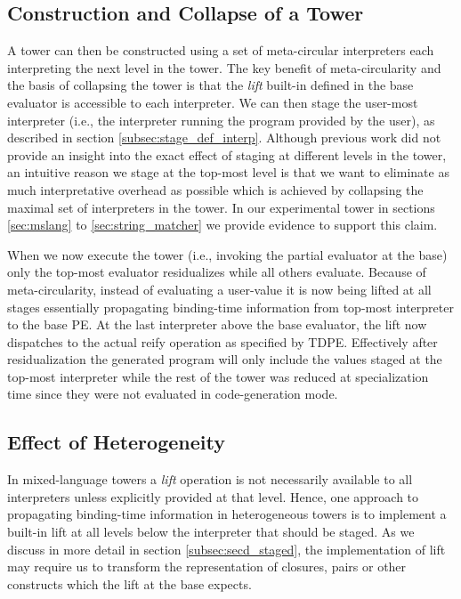 \documentclass[a4paper,12pt,twoside,openright]{report}
\theoremstyle{definition}
\begin{document}
\subsection{Construction and Collapse of a Tower}
A tower can then be constructed using a set of meta-circular interpreters each interpreting the next level in the tower. The key benefit of meta-circularity and the basis of collapsing the tower is that the \textit{lift} built-in defined in the base evaluator is accessible to each interpreter. We can then stage the user-most interpreter (i.e., the interpreter running the program provided by the user), as described in section \ref{subsec:stage_def_interp}. Although previous work did not provide an insight into the exact effect of staging at different levels in the tower, an intuitive reason we stage at the top-most level is that we want to eliminate as much interpretative overhead as possible which is achieved by collapsing the maximal set of interpreters in the tower. In our experimental tower in sections \ref{sec:mslang} to \ref{sec:string_matcher} we provide evidence to support this claim.

When we now execute the tower (i.e., invoking the partial evaluator at the base) only the top-most evaluator residualizes while all others evaluate. Because of meta-circularity, instead of evaluating a user-value it is now being lifted at all stages essentially propagating binding-time information from top-most interpreter to the base PE. At the last interpreter above the base evaluator, the lift now dispatches to the actual reify operation as specified by TDPE. Effectively after residualization the generated program will only include the values staged at the top-most interpreter while the rest of the tower was reduced at specialization time since they were not evaluated in code-generation mode.

\subsection{Effect of Heterogeneity}
In mixed-language towers a \textit{lift} operation is not necessarily available to all interpreters unless explicitly provided at that level. Hence, one approach to propagating binding-time information in heterogeneous towers is to implement a built-in lift at all levels below the interpreter that should be staged. As we discuss in more detail in section \ref{subsec:secd_staged}, the implementation of lift may require us to transform the representation of closures, pairs or other constructs which the lift at the base expects.
\end{document}
